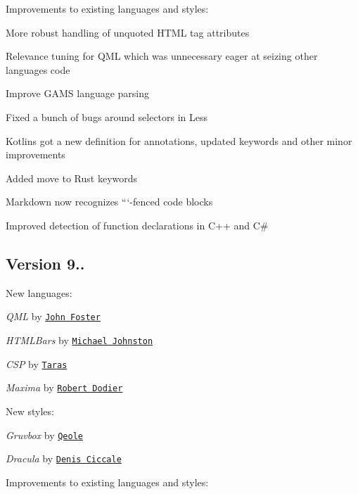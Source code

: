Improvements to existing languages and styles\+:


\begin{DoxyItemize}
\item More robust handling of unquoted H\+T\+ML tag attributes
\item Relevance tuning for Q\+ML which was unnecessary eager at seizing other languages\textquotesingle{} code
\item Improve G\+A\+MS language parsing
\item Fixed a bunch of bugs around selectors in Less
\item Kotlin\textquotesingle{}s got a new definition for annotations, updated keywords and other minor improvements
\item Added {\ttfamily move} to Rust keywords
\item Markdown now recognizes ```-\/fenced code blocks
\item Improved detection of function declarations in C++ and C\#
\end{DoxyItemize}

\subsection*{Version 9..}

New languages\+:


\begin{DoxyItemize}
\item {\itshape Q\+ML} by \href{https://github.com/jf990}{\tt John Foster}
\item {\itshape H\+T\+M\+L\+Bars} by \href{https://github.com/lastobelus}{\tt Michael Johnston}
\item {\itshape C\+SP} by \href{https://github.com/oxdef}{\tt Taras}
\item {\itshape Maxima} by \href{https://github.com/robert-dodier}{\tt Robert Dodier}
\end{DoxyItemize}

New styles\+:


\begin{DoxyItemize}
\item {\itshape Gruvbox} by \href{https://github.com/Qeole}{\tt Qeole}
\item {\itshape Dracula} by \href{https://github.com/dciccale}{\tt Denis Ciccale}
\end{DoxyItemize}

Improvements to existing languages and styles\+:


